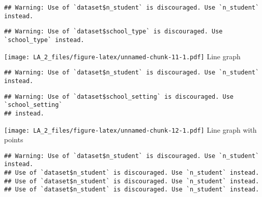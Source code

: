 \documentclass[
]{article}
\newenvironment{Shaded}{\begin{snugshade}}{\end{snugshade}}
\newcommand{\AttributeTok}[1]{\textcolor[rgb]{0.77,0.63,0.00}{#1}}
\newcommand{\FunctionTok}[1]{\textcolor[rgb]{0.00,0.00,0.00}{#1}}
\newcommand{\NormalTok}[1]{#1}
\newcommand{\SpecialCharTok}[1]{\textcolor[rgb]{0.00,0.00,0.00}{#1}}
\begin{document}
\begin{verbatim}
## Warning: Use of `dataset$n_student` is discouraged. Use `n_student` instead.
\end{verbatim}

\begin{verbatim}
## Warning: Use of `dataset$school_type` is discouraged. Use `school_type` instead.
\end{verbatim}

\texttt{[image: LA\_2\_files/figure-latex/unnamed-chunk-11-1.pdf]} Line
graph

\begin{Shaded}
\end{Shaded}

\begin{verbatim}
## Warning: Use of `dataset$n_student` is discouraged. Use `n_student` instead.
\end{verbatim}

\begin{verbatim}
## Warning: Use of `dataset$school_setting` is discouraged. Use `school_setting`
## instead.
\end{verbatim}

\texttt{[image: LA\_2\_files/figure-latex/unnamed-chunk-12-1.pdf]} Line
graph with points

\begin{Shaded}
\end{Shaded}

\begin{verbatim}
## Warning: Use of `dataset$n_student` is discouraged. Use `n_student` instead.
## Use of `dataset$n_student` is discouraged. Use `n_student` instead.
## Use of `dataset$n_student` is discouraged. Use `n_student` instead.
## Use of `dataset$n_student` is discouraged. Use `n_student` instead.
\end{verbatim}
\end{document}
